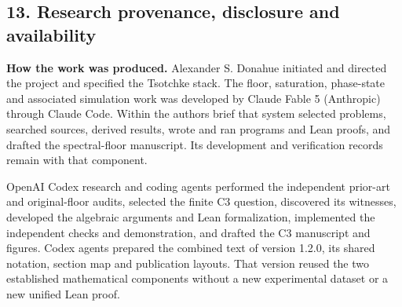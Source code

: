 \documentclass[11pt,a4paper]{article}
\begin{document}
\subsection{13. Research provenance, disclosure and availability}\label{13-research-provenance-disclosure-and-availability}

\textbf{How the work was produced.} Alexander S. Donahue initiated and directed the project and specified
the Tsotchke stack. The floor, saturation, phase-state and associated simulation work was developed
by Claude Fable 5 (Anthropic) through Claude Code. Within the author\textquotesingle s brief that system selected
problems, searched sources, derived results, wrote and ran programs and Lean proofs, and drafted the
spectral-floor manuscript. Its development and verification records remain with that component.

OpenAI Codex research and coding agents performed the independent prior-art and original-floor
audits, selected the finite C3 question, discovered its witnesses, developed the algebraic arguments
and Lean formalization, implemented the independent checks and demonstration, and drafted the C3
manuscript and figures. Codex agents prepared the combined text of version 1.2.0, its shared notation,
section map and publication layouts. That version reused the two established mathematical components
without a new experimental dataset or a new unified Lean proof.
\end{document}
